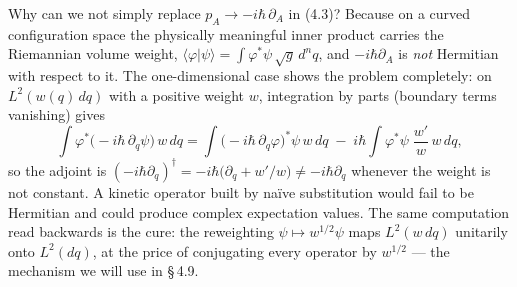 Why can we not simply replace $p_A\to-i\hbar\,\partial_A$ in (4.3)? Because on a curved configuration space the physically meaningful inner product carries the Riemannian volume weight, $\langle\varphi|\psi\rangle=\int\varphi^{*}\psi\,\sqrt{g}\,d^{n}q$, and $-i\hbar\partial_A$ is \emph{not} Hermitian with respect to it. The one-dimensional case shows the problem completely: on $L^{2}(w(q)\,dq)$ with a positive weight $w$, integration by parts (boundary terms vanishing) gives
\begin{equation}
\int\varphi^{*}\bigl(-i\hbar\,\partial_q\psi\bigr)\,w\,dq
=\int\bigl(-i\hbar\,\partial_q\varphi\bigr)^{*}\psi\,w\,dq
\;-\;i\hbar\int\varphi^{*}\psi\;\frac{w'}{w}\,w\,dq ,
\tag{4.4}
\end{equation}
so the adjoint is $(-i\hbar\partial_q)^{\dagger}=-i\hbar\bigl(\partial_q+w'/w\bigr)\neq-i\hbar\partial_q$ whenever the weight is not constant. A kinetic operator built by na\"ive substitution would fail to be Hermitian and could produce complex expectation values. The same computation read backwards is the cure: the reweighting $\psi\mapsto w^{1/2}\psi$ maps $L^{2}(w\,dq)$ unitarily onto $L^{2}(dq)$, at the price of conjugating every operator by $w^{1/2}$ --- the mechanism we will use in \S\,4.9.

